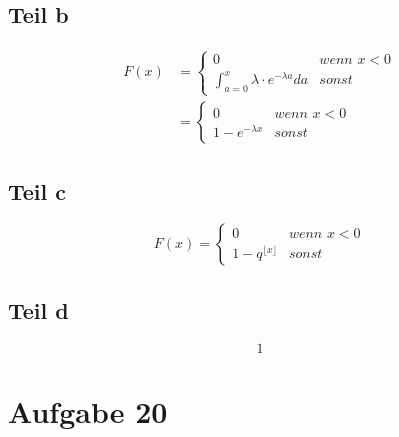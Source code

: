 \documentclass[10pt,a4paper]{article}
\begin{document}
\subsection{Teil b}
\begin{align*}
  F(x) & = 
  \begin{cases}
    0 & \textit{wenn $x < 0$}\\
    \int_{a = 0}^{x} \lambda \cdot e^{-\lambda a} da & \textit{sonst}
  \end{cases}\\
  & = 
  \begin{cases}
    0 & \textit{wenn $x < 0$}\\
    1 - e^{-\lambda x} & \textit{sonst}
  \end{cases}
\end{align*}

\subsection{Teil c}
\begin{equation}
  F(x) = 
  \begin{cases}
    0 & \textit{wenn $x < 0$}\\
    1 - q^{\lfloor x \rfloor} & \textit{sonst}
  \end{cases}
\end{equation}

\subsection{Teil d}
\begin{equation}
  1
\end{equation}

\section{Aufgabe 20}
\end{document}

